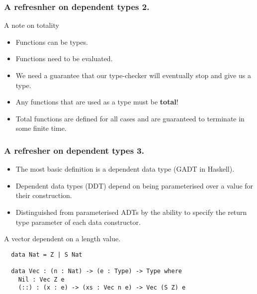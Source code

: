 \documentclass{beamer}
\begin{document}
\begin{frame}[fragile]
  \frametitle{A refresnher on dependent types 2.}
  \begin{block}{A note on totality}
    \begin{itemize}
      \item Functions can be types.
      \item Functions need to be evaluated.
      \item We need a guarantee that our type-checker
        will eventually stop and give us a type.
      \item Any functions that are used as a type must be
        \textbf{total}!
      \item Total functions are defined for all cases and are guaranteed
        to terminate in some finite time.
    \end{itemize}
  \end{block}
\end{frame}

\begin{frame}[fragile]
\frametitle{A refresher on dependent types 3.}
\begin{itemize}
  \item The most basic definition is a dependent data type (GADT in
          Haskell).
  \item Dependent data types (DDT) depend on being parameterised over a
        value for their construction.
  \item Distinguished from parameterised ADTs by the ability to
        specify the return type parameter of each data constructor.
\end{itemize}
\begin{minipage}{0.5\textwidth}
\begin{block}{A vector dependent on a length value.}
\begin{verbatim}
  data Nat = Z | S Nat

  data Vec : (n : Nat) -> (e : Type) -> Type where
    Nil : Vec Z e
    (::) : (x : e) -> (xs : Vec n e) -> Vec (S Z) e
\end{verbatim}
\end{block}
\end{minipage}
\end{frame}
\end{document}
